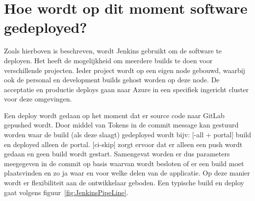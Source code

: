 \section{Hoe wordt op dit moment software gedeployed?} \label{sec:hoe-wordt-op-dit-moment-software-gedeployed?}
Zoals hierboven is beschreven, wordt Jenkins gebruikt om de software te deployen. Het heeft de mogelijkheid om meerdere builds te doen voor verschillende projecten. Ieder project wordt op een eigen node gebouwd, waarbij ook de personal en development builds gehost worden op deze node. De acceptatie en productie deploys gaan naar Azure in een specifiek ingericht cluster voor deze omgevingen.

Een deploy wordt gedaan op het moment dat er source code naar GitLab gepushed wordt. Door middel van Tokens in de commit message kan gestuurd worden waar de build (als deze slaagt) gedeployed wordt bijv: [-all + portal] build en deployed alleen de portal. [ci-skip] zorgt ervoor dat er alleen een push wordt gedaan en geen build wordt gestart.
Samengevat worden er dus parameters meegegeven in de commit op basis waarvan wordt besloten of er een build moet plaatsvinden en zo ja waar en voor welke delen van de applicatie. Op deze manier wordt er flexibiliteit aan de ontwikkelaar geboden. Een typische build en deploy gaat volgens figuur~\ref{fig:JenkinsPipeLine}.

